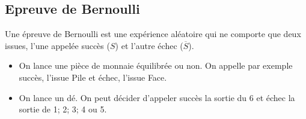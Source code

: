 
\everymath{\displaystyle}

  
 \subsection{Epreuve de Bernoulli}
  \begin{definition}
  Une  épreuve de Bernoulli  est une expérience aléatoire  qui ne comporte que deux issues, l'une appelée succès ($S$) et l'autre  échec ($\overline{S}$).
   
\end{definition}
\begin{example}
\begin{itemize}
\item On lance une pièce de monnaie équilibrée ou non. On appelle par exemple succès, l'issue Pile et échec, l'issue  Face.
\item  On lance un dé. On peut décider  d'appeler succès la sortie du 6 et échec la sortie de 1; 2; 3; 4   ou 5.

\end{itemize}
\end{example}
